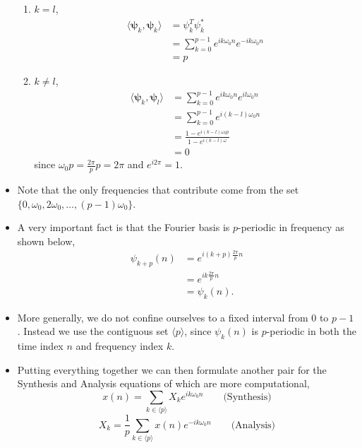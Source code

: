 \begin{itemize}
\begin{enumerate}
		      \item $k=l$,
		            \begin{align*}
			            \langle \bm{\psi}_{k}, \bm{\psi}_{k} \rangle & = \psi_{k}^T\psi_{k}^*                                  \\
			                                                         & = \sum_{k=0}^{p-1} e^{ik\omega_{0}n} e^{-ik\omega_{0}n} \\
			                                                         & = p
		            \end{align*}
		      \item $k\neq l$,
		            \begin{align*}
			            \langle \bm{\psi}_{k}, \bm{\psi}_{l} \rangle & = \sum_{k=0}^{p-1} e^{ik\omega_{0}n}e^{il\omega_{0}n} \\
			                                                         & = \sum_{k=0}^{p-1} e^{i(k-l)\omega_{0}n}              \\
			                                                         & = \frac{1-e^{i(k-l)\omega_{0}p}}{1-e^{i(k-l)\omega}}  \\
			                                                         & = 0
		            \end{align*}
		            since $\omega_0 p = \frac{2\pi}{p} p = 2\pi$ and $e^{i2\pi} = 1$.
	      \end{enumerate}
	\item Note that the only frequencies that contribute come from the set
	      $\{0, \omega_0, 2\omega_0, \ldots, (p-1)\omega_0\}$.
	\item A very important fact is that the Fourier basis is $p$-periodic in frequency as shown below,
	      \begin{align*}
		      \psi_{k+p}(n) & = e^{i(k+p)\frac{2\pi}{p}n} \\
		                    & = e^{ik\frac{2\pi}{p}n}     \\
		                    & = \psi_{k}(n)
		      .\end{align*}
	\item More generally, we do not confine ourselves to a fixed interval from $0$ to $p-1$. Instead
	      we use the contiguous set $\langle p \rangle$, since $\psi_{k}(n)$ is
	      $p$-periodic in both the time index $n$ and frequency index $k$.
	\item Putting everything together we can then formulate another pair for the Synthesis and Analysis equations
	      of which are more computational,
	      \begin{equation}
		      x(n) = \sum_{k \in \langle p \rangle} X_{k}e^{ik\omega_0 n} \qquad \text{(Synthesis)}
	      \end{equation}
	      \begin{equation}
		      X_{k} = \frac{1}{p}\sum_{k \in \langle p \rangle} x(n)e^{-ik\omega_0 n} \qquad \text{(Analysis)}
	      \end{equation}
\end{itemize}
